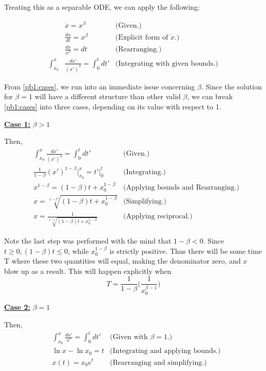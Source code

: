 \partbreak
\begin{solution}

Treating this as a separable ODE, we can apply the following:

\alignbreak
\begin{align}
&\dot{x} = x^\beta &\text{(Given.)} \nonumber\\
&\frac{dx}{dt} = x^\beta &\text{(Explicit form of $\dot{x}$.)} \nonumber\\
&\frac{dx}{x^\beta} = dt &\text{(Rearranging.)} \nonumber\\        
\int_{x_0}^x &\frac{dx'}{(x')^\beta} = \int_0^t dt' &\text{(Integrating with given bounds.)} \label{pb1:cases}
\end{align}
\alignbreak

From \ref{pb1:cases}, we run into an immediate issue concerning $\beta$. Since the solution for $\beta = 1$ will have a different structure than other valid $\beta$, we can break \ref{pb1:cases} into three cases, depending on its value with respect to 1.

\newpage
\underline{\textbf{Case 1:}} $\beta > 1$

Then, 
\begin{align}
 &\int_{x_0}^x \frac{dx'}{(x')^\beta} = \int_0^t dt' &\text{(Given.)}\nonumber\\
 &\frac{1}{1 - \beta}(x')^{1 - \beta}\bigg|_{x_0}^x = t' \bigg|_0^t &\text{(Integrating.)}\nonumber\\
&x^{1 - \beta} = (1 - \beta)t + x_0^{1 - \beta} &\text{(Applying bounds and Rearranging.)} \nonumber\\
&x = \sqrt[1 - \beta]{(1 - \beta)t + x_0^{1 - \beta}} &\text{(Simplifying.)}\nonumber\\
&x = \frac{1}{\sqrt[\beta - 1]{(1 - \beta)t + x_0^{1 - \beta}}} &\text{(Applying reciprocal.)} \nonumber
\end{align}

Note the last step was performed with the mind that $1 - \beta < 0$. Since $t \geq 0, (1 - \beta)t \leq 0$, while $x_0^{1 - \beta}$ is strictly positive. Thus there will be some time T where these two quantities will equal, making the denominator zero, and $x$ blow up as a result. This will happen explicitly when
\[T = \frac{1}{1 - \beta}\Bigg(\frac{1}{x_0^{\beta - 1}}\Bigg)\]

\underline{\textbf{Case 2:}} $\beta = 1$

Then,
\begin{align}
     &\int_{x_0}^x \frac{dx'}{x'} = \int_0^t dt' &\text{(Given with $\beta = 1$.)}\nonumber\\
    &\ln{x} - \ln x_0 = t &\text{(Integrating and applying bounds.)}\nonumber\\
    &x(t) = x_0e^t &\text{(Rearranging and simplifying.)}\nonumber\\
\end{align}


\end{solution}
